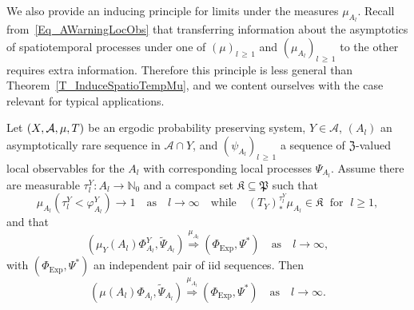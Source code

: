 \documentclass[10pt]{amsart}
\theoremstyle{definition}\newtheorem{defi}[theo]{Definition}\newtheorem{rema}[theo]{Remark}\newtheorem{exam}[theo]{Example}\newtheorem{exem}[theo]{Example}\newtheorem{nota}[theo]{Notation}
\newcommand{\clA}{\mathcal{A}}
\newcommand{\Expl}{\mathrm{Exp}}
\newcommand{\frkK}{\mathfrak{K}}
\newcommand{\frkP}{\mathfrak{P}}
\newcommand{\frkZ}{\mathfrak{Z}}
\newcommand{\bbN}{\mathbb{N}}
\begin{document}
We also provide an inducing principle for limits under the measures $\mu_{A_{l}}$. Recall from~\eqref{Eq_AWarningLocObs} that transferring information about the asymptotics of spatiotemporal processes under one of $(\mu)_{l\,\geq\,1}$ and $(\mu_{A_{l}})_{l\,\geq\,1}$ to the other requires extra information. Therefore this principle is less general than Theorem~\ref{T_InduceSpatioTempMu}, and we content ourselves with the case relevant for typical applications.

\begin{prop}\label{P_InduceSpatioTempFromAl}
Let $(X,\clA,\linebreak\mu,T)$ be an ergodic probability preserving system, $Y\in\clA$, $(A_{l})$ an asymptotically rare sequence in $\clA\cap Y$, and $(\psi_{A_{l}})_{l\,\geq\,1}$ a sequence of $\frkZ$-valued local observables for the $A_{l}$ with corresponding local processes $\Psi_{A_{l}}$. Assume there are measurable $\tau_{l} ^{Y}:A_{l}\rightarrow\bbN_{0}$ and a compact set $\frkK
\subseteq\frkP$ such that
\begin{equation}\label{Eq_xcxcxcxc}
\mu_{A_{l}}\left(\tau_{l}^{Y}<\varphi_{A_{l}}^{Y}\right) \longrightarrow 1\quad\text{as}\quad l\rightarrow\infty\quad\text{while}\quad(T_{Y})_{\ast}^{\tau _{l}^{Y}}\mu_{A_{l}}\in\frkK\;\text{ for }\;l\geq1,
\end{equation}
and that
\begin{equation}\label{Eq_xcxcxcxcx}
\left(\mu_{Y}(A_{l})\Phi_{A_{l}}^{Y},\widetilde{\Psi}_{A_{l}}\right)\overset{\mu_{A_{l}}}{\Longrightarrow}\left(\Phi_{\Expl},\Psi^{\ast}\right)\quad\text{as}\quad l\rightarrow\infty, 
\end{equation}
with $(\Phi_{\Expl},\Psi^{\ast})$ an independent pair of iid sequences. Then
\begin{equation}\label{Eq_khkhkhkkhhkhkhk}
\left(\mu(A_{l})\Phi_{A_{l}},\widetilde{\Psi}_{A_{l}}\right)\overset{\mu_{A_{l}}}{\Longrightarrow}\left(\Phi_{\Expl},\Psi^{\ast}\right)\quad\text{as}\quad l\rightarrow\infty. 
\end{equation}
\end{prop}
\end{document}
